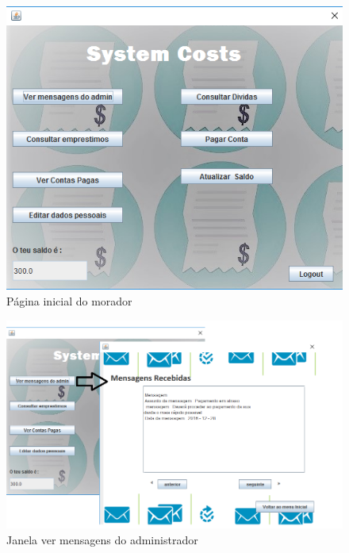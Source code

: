 \begin{figure}[h!]
	\centering
	\includegraphics[scale=0.6]{imagens/interface/moradorpaginicial}  
	\caption{Página inicial do morador}  
\end{figure}

\begin{figure}[h!]
	\centering
	\includegraphics[scale=0.6]{imagens/interface/vermensagensadmin}  
	\caption{Janela ver mensagens do administrador}  
\end{figure}


